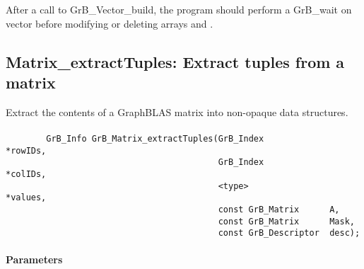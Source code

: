 
After a call to {\sf GrB\_Vector\_build}, the program should perform a 
{\sf GrB\_wait} on vector  before
modifying or deleting arrays  and .


\subsection{{\sf Matrix\_extractTuples}: Extract tuples from a matrix}
\label{Sec:Matrix_extractTuples}

Extract the contents of a GraphBLAS matrix into non-opaque data structures.

\paragraph{\syntax}

\begin{verbatim}
        GrB_Info GrB_Matrix_extractTuples(GrB_Index            *rowIDs,
                                          GrB_Index            *colIDs,
                                          <type>               *values, 
                                          const GrB_Matrix      A,
                                          const GrB_Matrix      Mask,
                                          const GrB_Descriptor  desc);
\end{verbatim}

\paragraph{Parameters}

